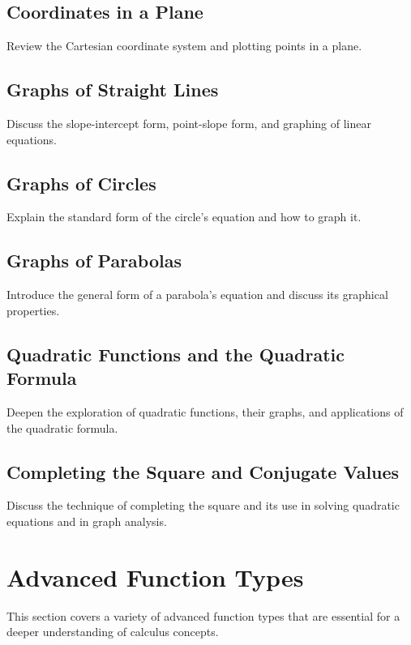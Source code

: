 \documentclass[a4paper,12pt]{book}
\begin{document}
\subsection{Coordinates in a Plane}
\label{subsec:coordinates_in_a_plane}
Review the Cartesian coordinate system and plotting points in a plane.


\subsection{Graphs of Straight Lines}
\label{subsec:graphs_of_straight_lines}
Discuss the slope-intercept form, point-slope form, and graphing of linear equations.


\subsection{Graphs of Circles}
\label{subsec:graphs_of_circles}
Explain the standard form of the circle's equation and how to graph it.


\subsection{Graphs of Parabolas}
\label{subsec:graphs_of_parabolas}
Introduce the general form of a parabola's equation and discuss its graphical properties.


\subsection{Quadratic Functions and the Quadratic Formula}
\label{subsec:quadratic_functions_formula}
Deepen the exploration of quadratic functions, their graphs, and applications of the quadratic formula.


\subsection{Completing the Square and Conjugate Values}
\label{subsec:completing_square_conjugate_values}
Discuss the technique of completing the square and its use in solving quadratic equations and in graph analysis.


\section{Advanced Function Types}
\label{sec:advanced_function_types}
This section covers a variety of advanced function types that are essential for a deeper understanding of calculus concepts.
\end{document}
